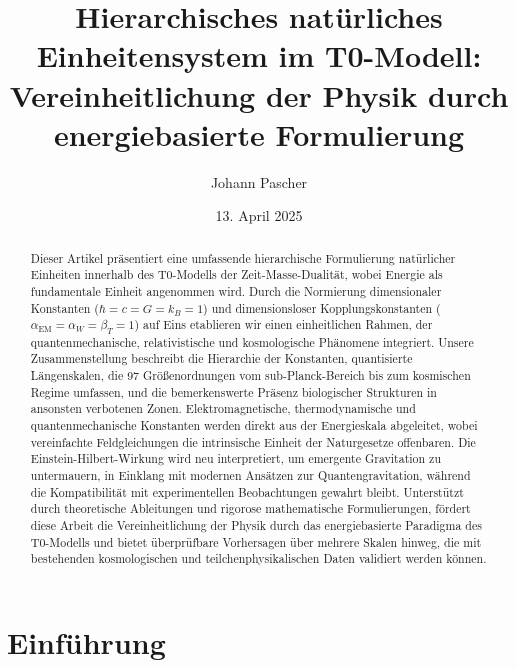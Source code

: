 \documentclass[twocolumn,aps,prl]{revtex4-2}
\begin{document}
	
	
	\title{Hierarchisches natürliches Einheitensystem im T0-Modell: Vereinheitlichung der Physik durch energiebasierte Formulierung}
	\author{Johann Pascher}
	\date{13. April 2025}
	
	\begin{abstract}
		Dieser Artikel präsentiert eine umfassende hierarchische Formulierung natürlicher Einheiten innerhalb des T0-Modells der Zeit-Masse-Dualität, wobei Energie als fundamentale Einheit angenommen wird. Durch die Normierung dimensionaler Konstanten ($\hbar = c = G = k_B = 1$) und dimensionsloser Kopplungskonstanten ($\alpha_{\text{EM}} = \alpha_W = \beta_T = 1$) auf Eins etablieren wir einen einheitlichen Rahmen, der quantenmechanische, relativistische und kosmologische Phänomene integriert. Unsere Zusammenstellung beschreibt die Hierarchie der Konstanten, quantisierte Längenskalen, die 97 Größenordnungen vom sub-Planck-Bereich bis zum kosmischen Regime umfassen, und die bemerkenswerte Präsenz biologischer Strukturen in ansonsten verbotenen Zonen. Elektromagnetische, thermodynamische und quantenmechanische Konstanten werden direkt aus der Energieskala abgeleitet, wobei vereinfachte Feldgleichungen die intrinsische Einheit der Naturgesetze offenbaren. Die Einstein-Hilbert-Wirkung wird neu interpretiert, um emergente Gravitation zu untermauern, in Einklang mit modernen Ansätzen zur Quantengravitation, während die Kompatibilität mit experimentellen Beobachtungen gewahrt bleibt. Unterstützt durch theoretische Ableitungen und rigorose mathematische Formulierungen, fördert diese Arbeit die Vereinheitlichung der Physik durch das energiebasierte Paradigma des T0-Modells und bietet überprüfbare Vorhersagen über mehrere Skalen hinweg, die mit bestehenden kosmologischen und teilchenphysikalischen Daten validiert werden können.
	\end{abstract}
	
	\maketitle
	
	\section{Einführung}
	\label{sec:introduction}
	
\end{document}

